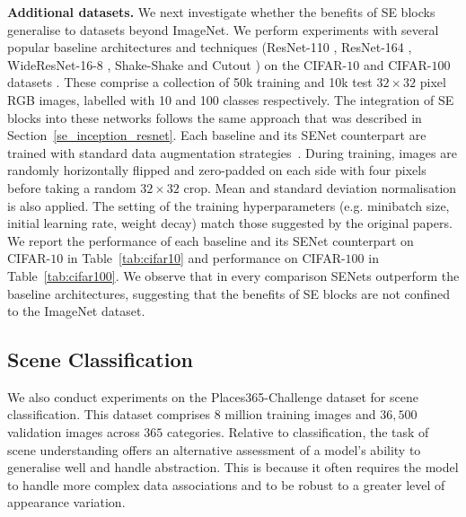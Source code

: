 \vspace{5pt}
\noindent\textbf{Additional datasets.} We next investigate whether the benefits of SE blocks generalise to datasets beyond ImageNet. We perform experiments with several popular baseline architectures and techniques (\mbox{ResNet-110} \cite{he_eccv2016preact}, \mbox{ResNet-164} \cite{he_eccv2016preact}, \mbox{WideResNet-16-8} \cite{zagoruyko_bmvc2016wrn}, \mbox{Shake-Shake} \cite{xavier_2017shake} and \mbox{Cutout} \cite{terrance_2017cutout}) on the CIFAR-$10$ and CIFAR-$100$ datasets \cite{krizhevsky2009learning}.  These comprise a collection of 50k training and 10k test $32 \times 32$ pixel RGB images, labelled with 10 and 100 classes respectively.  The integration of SE blocks into these networks follows the same approach that was described in Section~\ref{se_inception_resnet}.  Each baseline and its SENet counterpart are trained with standard data augmentation strategies~\cite{lin_iclr2014nin,huang_eccv2016sdepth}. During training, images are randomly horizontally flipped and zero-padded on each side with four pixels before taking a  random $32 \times 32$ crop. Mean and standard deviation normalisation is also applied. The setting of the training hyperparameters (e.g. minibatch size, initial learning rate, weight decay) match those suggested by the original papers. We report the performance  of each baseline and its SENet counterpart on CIFAR-$10$ in Table~\ref{tab:cifar10} and performance on CIFAR-$100$ in Table~\ref{tab:cifar100}.  We observe that in every comparison SENets outperform the baseline architectures, suggesting that the benefits of SE blocks are not confined to the ImageNet dataset.





\subsection{Scene Classification}

We also conduct experiments on the Places365-Challenge dataset \cite{zhou_pami2017places} for scene classification. This dataset comprises $8$ million training images and $36,500$ validation images across $365$ categories. Relative to classification, the task of scene understanding offers an alternative assessment of a model's ability to generalise well and handle abstraction.  This is because it often requires the model to handle more complex data associations and to be robust to a greater level of appearance variation.

